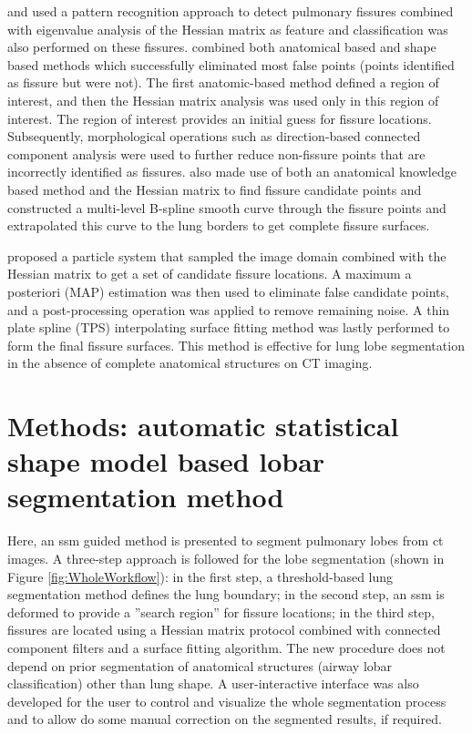\cite{ochs2007automated} and \cite{van2008supervised} used a pattern recognition approach to detect pulmonary fissures combined with eigenvalue analysis of the Hessian matrix as feature and classification was also performed on these fissures. \cite{lassen2011interactive,lassen2013automatic} combined both anatomical based and shape based methods which successfully eliminated most false points (points identified as fissure but were not). The first anatomic-based method defined a region of interest, and then the Hessian matrix analysis was used only in this region of interest. The region of interest provides an initial guess for fissure locations. Subsequently, morphological operations such as direction-based connected component analysis were used to further reduce non-fissure points that are incorrectly identified as fissures. \cite{doel2012pulmonary} also made use of both an anatomical knowledge based method and the Hessian matrix to find fissure candidate points and constructed a multi-level B-spline smooth curve through the fissure points and extrapolated this curve to the lung borders to get complete fissure surfaces.

\cite{ross2010automatic, ross2013pulmonary} proposed a particle system that sampled the image domain combined with the Hessian matrix to get a set of candidate fissure locations. A maximum a posteriori (MAP) estimation was then used to eliminate false candidate points, and a post-processing operation was applied to remove remaining noise. A thin plate spline (TPS) interpolating surface fitting method was lastly performed to form the final fissure surfaces. This method is effective for lung lobe segmentation in the absence of complete anatomical structures on CT imaging.

\section{Methods: automatic statistical shape model based lobar segmentation method} \label{SegmentationMethod}
Here, an \gls{ssm} guided method is presented to segment pulmonary lobes from \gls{ct} images. A three-step approach is followed for the lobe segmentation (shown in Figure \ref{fig:WholeWorkflow}): in the first step, a threshold-based lung segmentation method defines the lung boundary; in the second step, an \gls{ssm} is deformed to provide a ''search region'' for fissure locations; in the third step, fissures are located using a Hessian matrix protocol combined with connected component filters and a surface fitting algorithm. The new procedure does not depend on prior segmentation of anatomical structures (airway lobar classification) other than lung shape. A user-interactive interface was also developed for the user to control and visualize the whole segmentation process and to allow do some manual correction on the segmented results, if required.
\newpage

